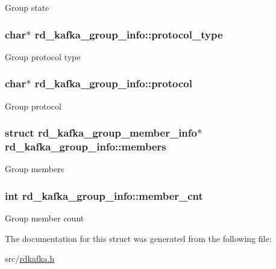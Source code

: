 \label{structrd__kafka__group__info_a5160a6f8963024c42164aa828eead885}
Group state \hypertarget{structrd__kafka__group__info_ab0f0461bf50a6a25ccab90e93d47d31f}{
\subsubsection[{protocol\_\-type}]{\setlength{\rightskip}{0pt plus 5cm}char$\ast$ {\bf rd\_\-kafka\_\-group\_\-info::protocol\_\-type}}}
\label{structrd__kafka__group__info_ab0f0461bf50a6a25ccab90e93d47d31f}
Group protocol type \hypertarget{structrd__kafka__group__info_aab4f80bfc4e0ce38774884e599690a68}{
\subsubsection[{protocol}]{\setlength{\rightskip}{0pt plus 5cm}char$\ast$ {\bf rd\_\-kafka\_\-group\_\-info::protocol}}}
\label{structrd__kafka__group__info_aab4f80bfc4e0ce38774884e599690a68}
Group protocol \hypertarget{structrd__kafka__group__info_a98032bb5d44fcd6fda60e0374ad8a2d4}{
\subsubsection[{members}]{\setlength{\rightskip}{0pt plus 5cm}struct {\bf rd\_\-kafka\_\-group\_\-member\_\-info}$\ast$ {\bf rd\_\-kafka\_\-group\_\-info::members}}}
\label{structrd__kafka__group__info_a98032bb5d44fcd6fda60e0374ad8a2d4}
Group members \hypertarget{structrd__kafka__group__info_a4b0bd08097252d3d086610e63f58bf49}{
\subsubsection[{member\_\-cnt}]{\setlength{\rightskip}{0pt plus 5cm}int {\bf rd\_\-kafka\_\-group\_\-info::member\_\-cnt}}}
\label{structrd__kafka__group__info_a4b0bd08097252d3d086610e63f58bf49}
Group member count 

The documentation for this struct was generated from the following file:\begin{DoxyCompactItemize}
\item 
src/\hyperlink{rdkafka_8h}{rdkafka.h}\end{DoxyCompactItemize}
